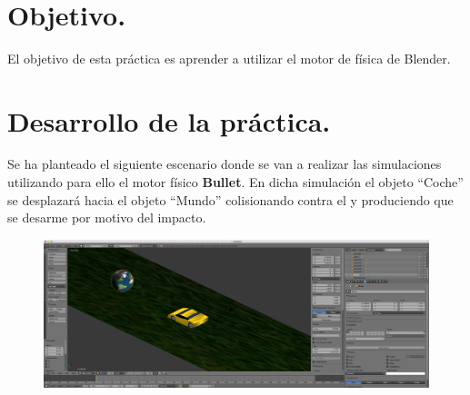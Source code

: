 \documentclass[10pt]{article}
\begin{document}
\begin{center}
 		\\																		%
\vspace{2cm} 																				
\begin{center}																					

 			\end{center}												  						
\end{center}							 											
																					
\newpage																		

\tableofcontents 

\newpage

\section{Objetivo.}
El objetivo de esta práctica es aprender a utilizar el motor de física de Blender.


\section{Desarrollo de la práctica.}
Se ha planteado el siguiente escenario donde se van a realizar las simulaciones utilizando para ello el motor físico \textbf{Bullet}. En dicha simulación el objeto ``Coche'' se desplazará hacia el objeto ``Mundo'' colisionando contra el y produciendo que se desarme por motivo del impacto. \\

\begin{figure}[H]
	\begin{center}
	 		\includegraphics[width = 1.00\textwidth]{Imagenes/p5-img1}
	\end{center} 
\end{figure}
\end{document}
